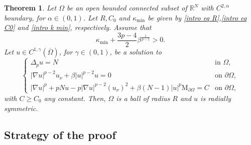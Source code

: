 \documentclass[10pt,a4paper]{amsart}
\numberwithin{equation}{section}
\newcommand{\R}{\mathbb{R}}
\newtheorem{teo}{Theorem}[section]
\begin{document}
\begin{teo}\label{intro main thm rigidity serrin}
    Let $\Omega$ be an open bounded connected subset of $\R^N$ with $C^{2,\alpha}$ boundary, for $\alpha \in (0,1)$. Let $R, C_0$ and $\kappa_{\min}$ be given by \eqref{intro eq R},\eqref{intro eq C0} and \eqref{intro k min}, respectively. Assume that
    \begin{equation}\label{intro eq condition kmin beta}
        \kappa_{\min} +  \frac{3p-4}{2} \beta^{\frac{1}{p-1}} > 0.
    \end{equation}
    Let $u \in C^{1,\gamma}(\overline{\Omega})$, for $\gamma \in (0,1)$, be a solution to
    \begin{equation}\label{intro eq: overdetermined problem}
    \begin{cases}
    \Delta_p u = N & \text{in } \Omega, \\
    |\nabla u|^{p-2} u_\nu  + \beta |u|^{p-2}u = 0 & \text{on } \partial\Omega, \\
    |\nabla u|^p + pNu - p |\nabla u|^{p-2} (u_\nu)^2 + \beta(N-1) |u|^p \mathrm{M}_{\partial\Omega} = C & \text{on } \partial\Omega,
    \end{cases}
    \end{equation}
    with $C \geq C_0$ any constant. Then, $\Omega$ is a ball of radius $R$ and $u$ is radially symmetric.
\end{teo}

\subsection{Strategy of the proof}\label{subsec strategy}
\end{document}
